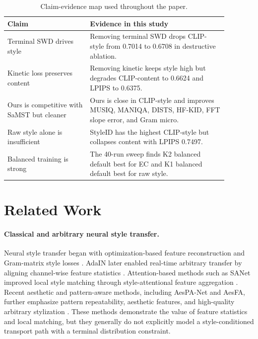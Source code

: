 ﻿\documentclass{article}
\begin{document}
\begin{table}[t]
\centering
\caption{Claim-evidence map used throughout the paper.}
\label{tab:claim_evidence}
\begin{tabular}{p{0.33\linewidth}p{0.55\linewidth}}
\toprule
Claim & Evidence in this study \\
\midrule
Terminal SWD drives style & Removing terminal SWD drops CLIP-style from 0.7014 to 0.6708 in destructive ablation. \\
Kinetic loss preserves content & Removing kinetic keeps style high but degrades CLIP-content to 0.6624 and LPIPS to 0.6375. \\
Ours is competitive with SaMST but cleaner & Ours is close in CLIP-style and improves MUSIQ, MANIQA, DISTS, HF-KID, FFT slope error, and Gram micro. \\
Raw style alone is insufficient & StyleID has the highest CLIP-style but collapses content with LPIPS 0.7497. \\
Balanced training is strong & The 40-run sweep finds K2 balanced default best for EC and K1 balanced default best for raw style. \\
\bottomrule
\end{tabular}
\end{table}

\section{Related Work}
\paragraph{Classical and arbitrary neural style transfer.}
Neural style transfer began with optimization-based feature reconstruction and Gram-matrix style losses \cite{gatys2016image}. AdaIN later enabled real-time arbitrary transfer by aligning channel-wise feature statistics \cite{huang2017adain}. Attention-based methods such as SANet improved local style matching through style-attentional feature aggregation \cite{park2019sanet}. Recent aesthetic and pattern-aware methods, including AesPA-Net and AesFA, further emphasize pattern repeatability, aesthetic features, and high-quality arbitrary stylization \cite{hong2023aespa,huang2024aesfa}. These methods demonstrate the value of feature statistics and local matching, but they generally do not explicitly model a style-conditioned transport path with a terminal distribution constraint.
\end{document}
